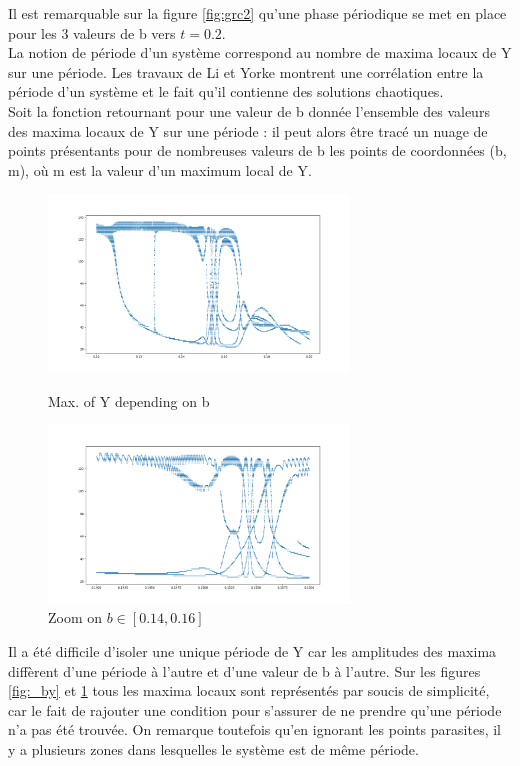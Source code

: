 \documentclass{article}
\begin{document}
Il est remarquable sur la figure \ref{fig:grc2} qu'une phase périodique se met en place pour les 3 valeurs de b vers $t=0.2$. \\

La notion de période d'un système correspond au nombre de maxima locaux de Y sur une période. Les travaux de Li et Yorke montrent une corrélation entre la période d'un système et le fait qu'il contienne des solutions chaotiques. \\

Soit la fonction retournant pour une valeur de b donnée l'ensemble des valeurs des maxima locaux de Y sur une période : il peut alors être tracé un nuage de points présentants pour de nombreuses valeurs de b les points de coordonnées (b, m), où m est la valeur d'un maximum local de Y.

\begin{figure}[h]
    \begin{minipage}[c]{.4\linewidth}
        \includegraphics[width = 8cm]{img/graphe_b_y.png}
        \caption{Max. of Y depending on b}
        \label{fig:_by}
    \end{minipage}
        \hfill%
    \begin{minipage}[c]{.4\linewidth}
        \includegraphics[width = 8cm]{img/graphe_b_y_14_16.png}
        \caption{Zoom on $b\in[0.14, 0.16]$}
        \label{fig:_by_14_16}
    \end{minipage} 
\end{figure}

Il a été difficile d'isoler une unique période de Y car les amplitudes des maxima diffèrent d'une période à l'autre et d'une valeur de b à l'autre. Sur les figures \ref{fig:_by} et \ref{fig:_by_14_16} tous les maxima locaux sont représentés par soucis de simplicité, car le fait de rajouter une condition pour s'assurer de ne prendre qu'une période n'a pas été trouvée. On remarque toutefois qu'en ignorant les points parasites, il y a plusieurs zones dans lesquelles le système est de même période.  
\end{document}
